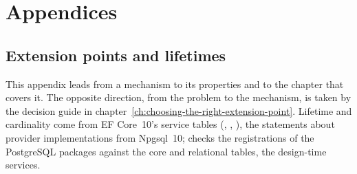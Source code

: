 \part{Appendices}\label{part:appendices}

\appendix

\chapter{Extension points and lifetimes}\label{app:A}

This appendix leads from a mechanism to its properties and to the chapter that covers it. The
opposite direction, from the problem to the mechanism, is taken by the decision guide in
chapter~\ref{ch:choosing-the-right-extension-point}. Lifetime and cardinality come from
EF Core~10's service tables
(,
,
),
the statements about provider implementations from Npgsql~10;
 checks the registrations of the
PostgreSQL packages against the core and relational tables,
 the design-time services.

